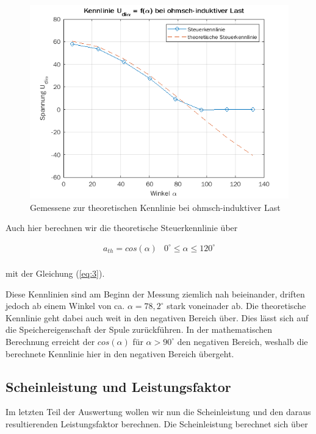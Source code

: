 \documentclass{article}
\begin{document}
\begin{figure}[h]
  \centering
  \includegraphics[width=.75\textwidth]{../assets/images/GEP2/udia_alpha_induk.png}
  \caption{Gemessene zur theoretischen Kennlinie bei ohmsch-induktiver Last}
  \label{fig:udiaalphainduk}
\end{figure}

\pagebreak[4]
Auch hier berechnen wir die theoretische Steuerkennlinie über

\begin{equation*}
  \label{eq:4}
  \begin{array}{ll}
    a_{th} = cos(\alpha) & 0^{\circ} \leq\alpha\leq 120^{\circ}\\
  \end{array}
\end{equation*}

mit der Gleichung (\ref{eq:3}).

\noindent
Diese Kennlinien sind am Beginn der Messung ziemlich nah beieinander, driften jedoch ab einem Winkel von ca. $\alpha = 78,2^{\circ}$ stark voneinader ab. Die theoretische Kennlinie geht dabei auch weit in den negativen Bereich über. Dies lässt sich auf die Speichereigenschaft der Spule zurückführen. In der mathematischen Berechnung erreicht der $cos(\alpha)$ für $\alpha > 90^{\circ}$ den negativen Bereich, weshalb die berechnete Kennlinie hier in den negativen Bereich übergeht.

\subsection{Scheinleistung und Leistungsfaktor}
\label{sec:sche-und-leist}

Im letzten Teil der Auswertung wollen wir nun die Scheinleistung und den daraus resultierenden Leistungsfaktor berechnen. Die Scheinleistung berechnet sich über
\end{document}
